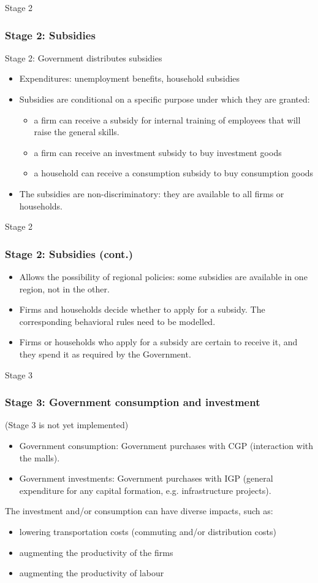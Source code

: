 \documentclass{beamer}
\begin{document}
\begin{frame}{Stage 2}
\frametitle{Stage 2: Subsidies}
Stage 2: Government distributes subsidies
\begin{itemize}
\item Expenditures: unemployment benefits, household subsidies
\item Subsidies are conditional on a specific purpose under which they
are granted:
	\begin{itemize}
	\item a firm can receive a subsidy for internal training of employees that
	will raise the general skills.
	\item a firm can receive an investment subsidy to buy investment goods
	\item a household can receive a consumption subsidy to buy consumption goods
	\end{itemize}
\item The subsidies are non-discriminatory: they are available to all firms
or households. 
\end{itemize}
\end{frame}

\begin{frame}{Stage 2}
\frametitle{Stage 2: Subsidies (cont.)}
\begin{itemize}
\item Allows the possibility of regional policies:
some subsidies are available in one region, not in the other.
\item Firms and households decide whether to apply for a subsidy.
The corresponding behavioral rules need to be modelled.
\item Firms or households who apply for a subsidy are certain to receive it, and
they spend it as required by the Government.
\end{itemize}
\end{frame}


\begin{frame}{Stage 3}
\frametitle{Stage 3: Government consumption and investment}
(Stage 3 is not yet implemented)
\begin{itemize}
\item Government consumption: Government purchases with CGP (interaction
with the malls).
\item Government investments: Government purchases with IGP (general
expenditure for any capital formation, e.g. infrastructure projects).
\end{itemize}

The investment and/or consumption can have diverse impacts, such as:
\begin{itemize}
\item lowering transportation costs (commuting and/or distribution costs)
\item augmenting the productivity of the firms
\item augmenting the productivity of labour
\end{itemize}
\end{frame}
\end{document}
